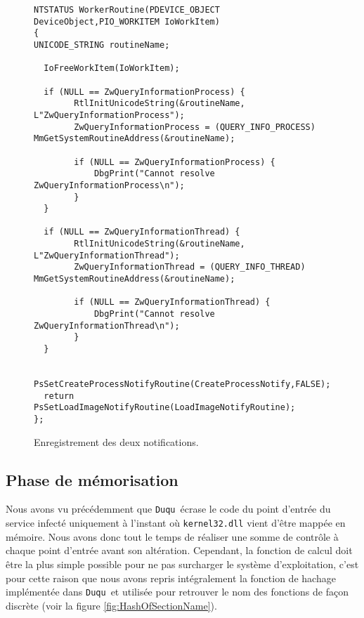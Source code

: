 \documentclass[times,11pt,fullpage]{article}
\newcommand{\Duqu}{\texttt{Duqu}}
\begin{document}
\begin{figure}
\scriptsize
\begin{framed}
\begin{verbatim}
NTSTATUS WorkerRoutine(PDEVICE_OBJECT DeviceObject,PIO_WORKITEM IoWorkItem)
{
UNICODE_STRING routineName;

  IoFreeWorkItem(IoWorkItem);

  if (NULL == ZwQueryInformationProcess) {
        RtlInitUnicodeString(&routineName, L"ZwQueryInformationProcess");
        ZwQueryInformationProcess = (QUERY_INFO_PROCESS) MmGetSystemRoutineAddress(&routineName);

        if (NULL == ZwQueryInformationProcess) {
            DbgPrint("Cannot resolve ZwQueryInformationProcess\n");
        }
  }

  if (NULL == ZwQueryInformationThread) {
        RtlInitUnicodeString(&routineName, L"ZwQueryInformationThread");
        ZwQueryInformationThread = (QUERY_INFO_THREAD) MmGetSystemRoutineAddress(&routineName);

        if (NULL == ZwQueryInformationThread) {
            DbgPrint("Cannot resolve ZwQueryInformationThread\n");
        }
  }

  PsSetCreateProcessNotifyRoutine(CreateProcessNotify,FALSE);
  return PsSetLoadImageNotifyRoutine(LoadImageNotifyRoutine);
};
\end{verbatim}
\end{framed}
\caption{Enregistrement des deux notifications.\label{fig:WorkerRoutine}}
\end{figure}

\subsection{Phase de mémorisation}
Nous avons vu précédemment que \Duqu\ écrase le code du point d'entrée du service infecté uniquement à l'instant où \texttt{kernel32.dll} vient d'être mappée en mémoire. Nous avons donc tout le temps de réaliser une somme de contrôle à chaque point d'entrée avant son altération. Cependant, la fonction de calcul doit être la plus simple possible pour ne pas surcharger le système d'exploitation, c'est pour cette raison que nous avons repris intégralement la fonction de hachage implémentée dans \Duqu\ et utilisée pour retrouver le nom des fonctions de façon discrète (voir la figure \ref{fig:HashOfSectionName}).   
\end{document}
